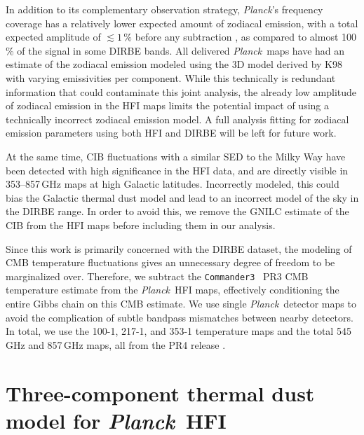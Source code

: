 \documentclass{aa}
\def\Planck{\textit{Planck}}
\def\commanderthree{\texttt{Commander3} }
\begin{document}
In addition to its complementary observation strategy, \Planck's frequency coverage has a relatively lower expected amount of zodiacal emission, with a total expected amplitude of $\lesssim1\,\%$ before any subtraction \citep{maris2006c,planck2013-pip88}, as compared to almost 100\,\% of the signal in some DIRBE bands. All delivered \Planck\ maps have had an estimate of the zodiacal emission modeled using the 3D model derived by K98 with varying emissivities per component. While this technically is redundant information that could contaminate this joint analysis, the already low amplitude of zodiacal emission in the HFI maps limits the potential impact of using a technically incorrect zodiacal emission model. A full analysis fitting for zodiacal emission parameters using both HFI and DIRBE will be left for future work.

At the same time, CIB fluctuations with a similar SED to the Milky Way have been detected with high significance in the HFI data, and are directly visible in 353--857\,GHz maps at high Galactic latitudes. Incorrectly modeled, this could bias the Galactic thermal dust model and lead to an incorrect model of the sky in the DIRBE range. In order to avoid this, we remove the GNILC \citep{planck2016-XLVIII} estimate of the CIB from the HFI maps before including them in our analysis.

Since this work is primarily concerned with the DIRBE dataset, the modeling of CMB temperature fluctuations gives an unnecessary degree of freedom to be marginalized over. Therefore, we subtract the \commanderthree\ PR3 CMB temperature estimate from the \Planck\ HFI maps, effectively conditioning the entire Gibbs chain on this CMB estimate.
We use single \Planck\ detector maps to avoid the complication of subtle bandpass mismatches between nearby detectors. In total, we use the 100-1, 217-1, and 353-1 temperature maps and the total 545\,GHz and 857\,GHz maps, all from the PR4 release \citep{npipe}.

\clearpage
\section{Three-component thermal dust model for \Planck\ HFI}
\end{document}
